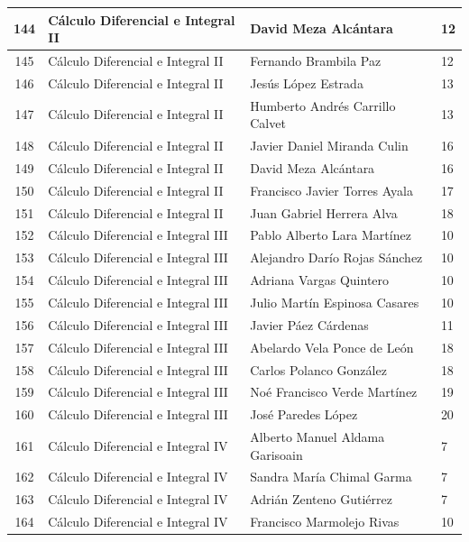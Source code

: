 {\begin{longtable}{|c|p{6.5cm}|p{5cm}|p{1.5cm}|}
  144 & Cálculo Diferencial e Integral II & David Meza Alcántara & 12 \\ \hline
  145 & Cálculo Diferencial e Integral II & Fernando Brambila Paz & 12 \\ \hline
  146 & Cálculo Diferencial e Integral II & Jesús López Estrada & 13 \\ \hline
  147 & Cálculo Diferencial e Integral II & Humberto Andrés Carrillo Calvet & 13 \\ \hline
  148 & Cálculo Diferencial e Integral II & Javier Daniel Miranda Culin & 16 \\ \hline
  149 & Cálculo Diferencial e Integral II & David Meza Alcántara & 16 \\ \hline
  150 & Cálculo Diferencial e Integral II & Francisco Javier Torres Ayala & 17 \\ \hline
  151 & Cálculo Diferencial e Integral II & Juan Gabriel Herrera Alva & 18 \\ \hline
  152 & Cálculo Diferencial e Integral III & Pablo Alberto Lara Martínez & 10 \\ \hline
  153 & Cálculo Diferencial e Integral III & Alejandro Darío Rojas Sánchez & 10 \\ \hline
  154 & Cálculo Diferencial e Integral III & Adriana Vargas Quintero & 10 \\ \hline
  155 & Cálculo Diferencial e Integral III & Julio Martín Espinosa Casares & 10 \\ \hline
  156 & Cálculo Diferencial e Integral III & Javier Páez Cárdenas & 11 \\ \hline
  157 & Cálculo Diferencial e Integral III & Abelardo Vela Ponce de León & 18 \\ \hline
  158 & Cálculo Diferencial e Integral III & Carlos Polanco González & 18 \\ \hline
  159 & Cálculo Diferencial e Integral III & Noé Francisco Verde Martínez & 19 \\ \hline
  160 & Cálculo Diferencial e Integral III & José Paredes López & 20 \\ \hline
  161 & Cálculo Diferencial e Integral IV & Alberto Manuel Aldama Garisoain & 7 \\ \hline
  162 & Cálculo Diferencial e Integral IV & Sandra María Chimal Garma & 7 \\ \hline
  163 & Cálculo Diferencial e Integral IV & Adrián Zenteno Gutiérrez & 7 \\ \hline
  164 & Cálculo Diferencial e Integral IV & Francisco Marmolejo Rivas & 10 \\ \hline

\end{longtable}}

